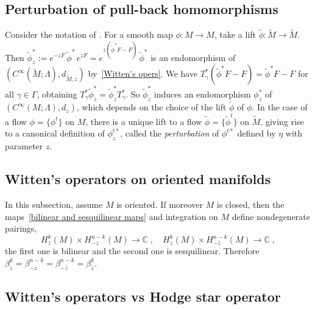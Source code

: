 \documentclass{memo-l}
\theoremstyle{plain}
\theoremstyle{definition}
\theoremstyle{remark}
\newcommand{\C}{\mathbb{C}}
\numberwithin{section}{chapter}
\numberwithin{equation}{section}%
\begin{document}
\subsection{Perturbation of pull-back homomorphisms}\label{ss: perturbation of pull-back homs}

Consider the notation of . For a smooth map $\phi:M\to M$, take a lift $\tilde\phi:\widetilde M\to\widetilde M$. Then $\tilde\phi^*_z:=e^{-zF}\,\tilde\phi^*\,e^{zF}=e^{z(\tilde\phi^*F-F)}\,\tilde\phi^*$ is an endomorphism of $(C^\infty(\widetilde M;\Lambda),d_{\widetilde M,z})$ by~\eqref{Witten's opers}. We have $T_\gamma^*(\tilde\phi^*F-F)=\tilde\phi^*F-F$ for all $\gamma\in\Gamma$, obtaining $T_\gamma^*\tilde\phi^*_z=\tilde\phi^*_zT_\gamma^*$. So $\tilde\phi^*_z$ induces an endomorphism $\phi^*_z$ of $(C^\infty(M;\Lambda),d_z)$, which depends on the choice of the lift $\tilde\phi$ of $\phi$. In the case of a flow $\phi=\{\phi^t\}$ on $M$, there is a unique lift to a flow $\tilde\phi=\{\tilde\phi^t\}$ on $\widetilde M$, giving rise to a canonical definition of $\phi^{t*}_z$,  called the \emph{perturbation} of $\phi^{t*}$ defined by $\eta$ with parameter $z$.



\subsection{Witten's operators on oriented manifolds}\label{ss: perturbed ops on oriented mfds}

In this subsection, assume $M$ is oriented. If moreover $M$ is closed, then the maps~\eqref{bilinear and sesquilinear maps} and integration on $M$ define nondegenerate pairings,
\begin{equation}\label{H_z^k(M) times H_-z^n-kM) to C}
H_z^k(M)\times H_{-z}^{n-k}(M)\to\C\;,\quad
H_z^k(M)\times H_{-\bar z}^{n-k}(M)\to\C\;,
\end{equation}
the first one is bilinear and the second one is sesquilinear. Therefore $\beta_z^k=\beta_{-z}^{n-k}=\beta_{-\bar z}^{n-k}=\beta_{\bar z}^k$.


\subsection{Witten's operators vs Hodge star operator}\label{ss: Witten vs Hodge star}
\end{document}
